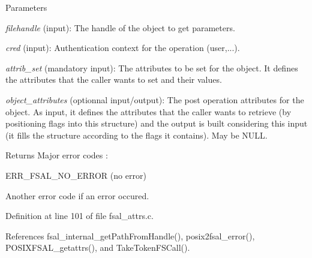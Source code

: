 \begin{DoxyParams}{Parameters}
\item[{\em filehandle}](input): The handle of the object to get parameters. \item[{\em cred}](input): Authentication context for the operation (user,...). \item[{\em attrib\_\-set}](mandatory input): The attributes to be set for the object. It defines the attributes that the caller wants to set and their values. \item[{\em object\_\-attributes}](optionnal input/output): The post operation attributes for the object. As input, it defines the attributes that the caller wants to retrieve (by positioning flags into this structure) and the output is built considering this input (it fills the structure according to the flags it contains). May be NULL.\end{DoxyParams}
\begin{DoxyReturn}{Returns}
Major error codes :
\begin{DoxyItemize}
\item ERR\_\-FSAL\_\-NO\_\-ERROR (no error)
\item Another error code if an error occured. 
\end{DoxyItemize}
\end{DoxyReturn}


Definition at line 101 of file fsal\_\-attrs.c.

References fsal\_\-internal\_\-getPathFromHandle(), posix2fsal\_\-error(), POSIXFSAL\_\-getattrs(), and TakeTokenFSCall().